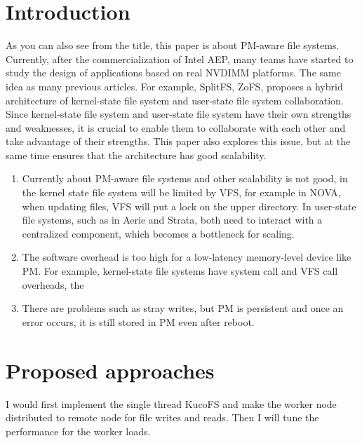 \documentclass[acmtog]{acmart}
\begin{document}

\keywords{}


\maketitle

\section{Introduction}
As you can also see from the title, this paper is about PM-aware file systems. Currently, after the commercialization of Intel AEP, many teams have started to study the design of applications based on real NVDIMM platforms. The same idea as many previous articles. For example, SplitFS, ZoFS, proposes a hybrid architecture of kernel-state file system and user-state file system collaboration. Since kernel-state file system and user-state file system have their own strengths and weaknesses, it is crucial to enable them to collaborate with each other and take advantage of their strengths. This paper also explores this issue, but at the same time ensures that the architecture has good scalability.

\begin{enumerate}

\item  Currently about PM-aware file systems and other scalability is not good, in the kernel state file system will be limited by VFS, for example in NOVA, when updating files, VFS will put a lock on the upper directory. In user-state file systems, such as in Aerie and Strata, both need to interact with a centralized component, which becomes a bottleneck for scaling.
\item The software overhead is too high for a low-latency memory-level device like PM. For example, kernel-state file systems have system call and VFS call overheads, the
\item There are problems such as stray writes, but PM is persistent and once an error occurs, it is still stored in PM even after reboot.
\end{enumerate}


\section{Proposed approaches}
I would first implement the single thread KucoFS and make the worker node distributed to remote node for file writes and reads. Then I will tune the performance for the worker loads.
\end{document}
